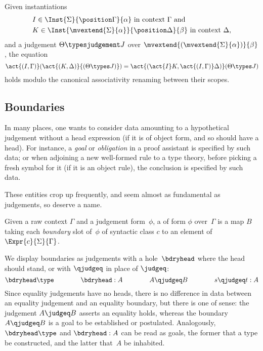 \begin{propositionwithqed} \label{prop:instantiate-instantiate-judgement}
   Given instantiations
   \begin{align*}
     & \text{$I \in \Inst{\Sigma}{\position \Gamma}{\alpha}$ in context $\Gamma$ and}\\
     & \text{$K \in \Inst{\mvextend{\Sigma}{\alpha}}{\position \Delta}{\beta}$ in context $\Delta$},
   \end{align*}
   and a judgement $\Theta \typesjudgement J$ over $\mvextend{(\mvextend{\Sigma}{\alpha})}{\beta}$, the equation
   \begin{equation*}
     \act{(I,\Gamma)}(\act{(K,\Delta)}{(\Theta \types J)}) = \act{(\act{I}K,\act{(I,\Gamma)}\Delta)}(\Theta \types J)
   \end{equation*}
   holds modulo the canonical associativity renaming between their scopes.
\end{propositionwithqed}

\subsection{Boundaries}
\label{sec:boundaries}

In many places, one wants to consider data amounting to a hypothetical judgement without a head expression (if it is of object form, and so should have a head).
%
For instance, a \emph{goal} or \emph{obligation} in a proof assistant is specified by such data;
%
or when adjoining a new well-formed rule to a type theory, before picking a fresh symbol for it (if it is an object rule), the conclusion is specified by such data. 

These entities crop up frequently, and seem almost as fundamental as judgements, so deserve a name.

\begin{definition}
  Given a raw context $\Gamma$ and a judgement form~$\phi$, a  of form $\phi$ over~$\Gamma$ is a map $B$ taking each \emph{boundary} slot of~$\phi$ of syntactic class $c$ to an element of  $\Expr{c}{\Sigma}{\Gamma}$.
\end{definition}

We display boundaries as judgements with a hole~$\bdryhead$ where the head should stand, or with $\qjudgeq$ in place of $\judgeq$:
%
\begin{equation*}
  \bdryhead \type
  \qquad\qquad
  \bdryhead : A
  \qquad\qquad
  A \qjudgeq B
  \qquad\qquad
  s \qjudgeq t : A
\end{equation*}
%
Since equality judgements have no heads, there is no difference in data between an equality judgement and an equality boundary, but there is one of sense: the judgement $A \judgeq B$ asserts an equality holds, whereas the boundary $A \qjudgeq B$ is a goal to be established or postulated.
%
Analogously,  $\bdryhead \type$ and $\bdryhead : A$ can be read as goals, the former that a type be constructed, and the latter that~$A$ be inhabited.

